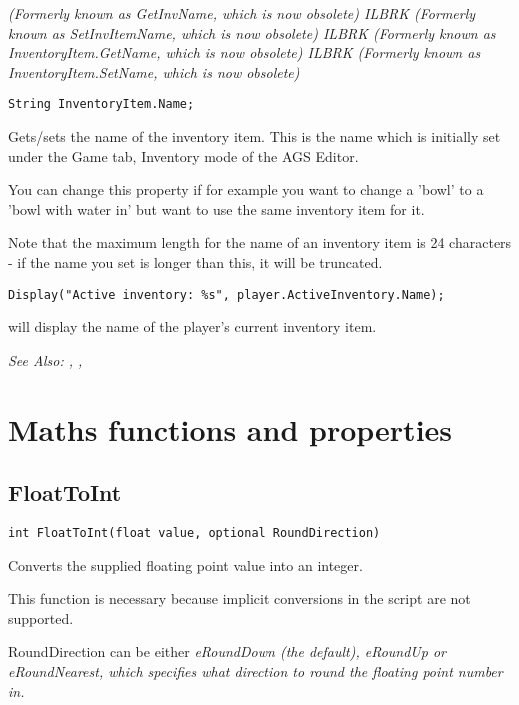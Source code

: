 \it{(Formerly known as GetInvName, which is now obsolete)} ILBRK
\it{(Formerly known as SetInvItemName, which is now obsolete)} ILBRK
\it{(Formerly known as InventoryItem.GetName, which is now obsolete)} ILBRK
\it{(Formerly known as InventoryItem.SetName, which is now obsolete)}

\begin{verbatim}
String InventoryItem.Name;
\end{verbatim}
Gets/sets the name of the inventory item. This is the name which is
initially set under the Game tab, Inventory mode of the AGS Editor.

You can change this property if for example you want to change a 'bowl'
to a 'bowl with water in' but want to use the same inventory item for it.

Note that the maximum length for the name of an inventory item is 24 characters - if the
name you set is longer than this, it will be truncated.

\begin{verbatim}
Display("Active inventory: %s", player.ActiveInventory.Name);
\end{verbatim}
will display the name of the player's current inventory item.

\it{See Also:} ,
,



\section{Maths functions and properties}%



\subsection{FloatToInt}\label{FloatToInt}%

\begin{verbatim}
int FloatToInt(float value, optional RoundDirection)
\end{verbatim}
Converts the supplied floating point value into an integer.

This function is necessary because implicit conversions in the script are not supported.

RoundDirection can be either \it{eRoundDown} (the default), \it{eRoundUp} or \it{eRoundNearest},
which specifies what direction to round the floating point number in.

